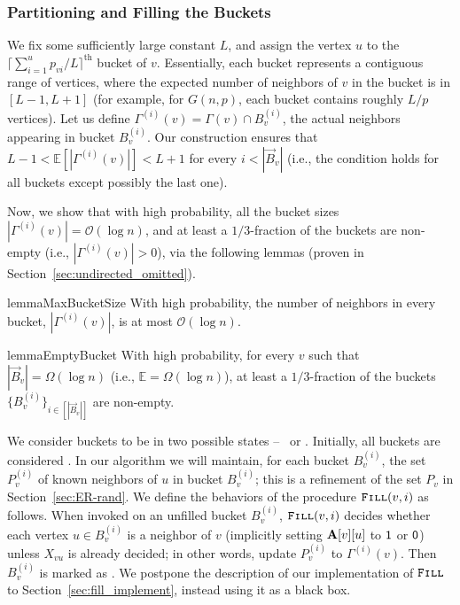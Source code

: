 \subsubsection{Partitioning and Filling the Buckets}
\label{sec:bucket_partitioning_and_filling}
We fix some sufficiently large constant $L$, and assign the vertex $u$ to the $\lceil\sum^{u}_{i=1} p_{vi}/L\rceil^\textrm{th}$ bucket of $v$.
Essentially, each bucket represents a contiguous range of vertices, where the expected number of neighbors of $v$ in the bucket is in $[L-1,L+1]$
(for example, for $G(n,p)$, each bucket contains roughly $L/p$ vertices).
Let us define $\Gamma^{(i)}(v) = \Gamma(v) \cap B^{(i)}_v$, the actual neighbors appearing in bucket $B^{(i)}_v$.
Our construction ensures that $L-1 < \mathbb E \left[|\Gamma^{(i)}(v)|\right] < L+1$ for every $i < |\vec B_v|$
(i.e., the condition holds for all buckets except possibly the last one).

Now, we show that with high probability, all the bucket sizes $|\Gamma^{(i)}(v)|=\mathcal{O}(\log n)$, and at least a $1/3$-fraction of the buckets are non-empty (i.e., $|\Gamma^{(i)}(v)|>0$), via the following lemmas (proven in Section~\ref{sec:undirected_omitted}).

\begin{restatable}{lemma}{MaxBucketSize}
\label{lem:MaxBucketSize}
With high probability, the number of neighbors in every bucket, $|\Gamma^{(i)}(v)|$, is at most $ \mathcal{O}(\log n)$.
\end{restatable}

\begin{restatable}{lemma}{EmptyBucket}
\label{lem:EmptyBucket}
With high probability, for every $v$ such that $|\vec B_v| = \Omega(\log n)$ (i.e., $\mathbb E = \Omega(\log n)$), at least a $1/3$-fraction of the buckets $\{B^{(i)}_v\}_{i\in[|\vec B_v|]}$ are non-empty.
\end{restatable}

We consider buckets to be in two possible states -- \filled~or \unfilled. Initially, all buckets are considered \unfilled.
In our algorithm we will maintain, for each bucket $B^{(i)}_v$, the set $P^{(i)}_v$ of known neighbors of $u$ in bucket $B^{(i)}_v$;
this is a refinement of the set $P_v$ in Section~\ref{sec:ER-rand}.
We define the behaviors of the procedure $\texttt{\textsc{Fill}}(v,i)$ as follows.
When invoked on an unfilled bucket $B^{(i)}_v$, $\texttt{\textsc{Fill}}(v,i)$ decides whether each vertex $u \in B^{(i)}_v$ is a neighbor of $v$
(implicitly setting $\mathbf{A}[v][u]$ to $\mathsf{1}$ or $\mathsf{0}$) unless $X_{vu}$ is already decided; in other words, update $P_v^{(i)}$ to $\Gamma^{(i)}(v)$.
Then $B^{(i)}_v$ is marked as \filled.
We postpone the description of our implementation of $\texttt{\textsc{Fill}}$ to Section~\ref{sec:fill_implement}, instead using it as a black box.





